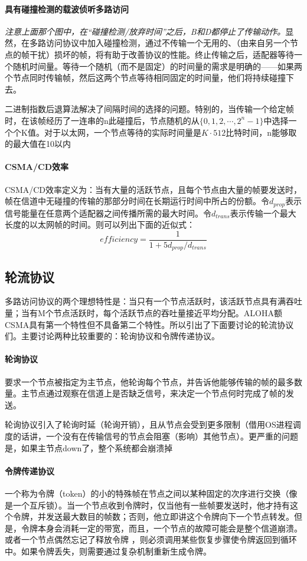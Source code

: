 \documentclass[]{report}
\newcommand{\myCoral}{\color[HTML]{FF7F50}} %
\newcommand{\quan}[1]{{\nmfont \symbol{#1}}}
\newcommand{\kk}[1]{\quan{\numexpr32+#1}}%
\begin{document}
			\paragraph{具有碰撞检测的载波侦听多路访问}
			\textit{注意上面那个图中，在“碰撞检测/放弃时间”之后，B和D都停止了传输动作。}显然，在多路访问协议中加入碰撞检测，通过不传输一个无用的、（由来自另一个节点的帧干扰）损坏的帧，将有助于改善协议的性能。终止传输之后，适配器等待一个随机时间量。等待一个随机（而不是固定）的时间量的需求是明确的——如果两个节点同时传输帧，然后这两个节点等待相同固定的时间量，他们将持续碰撞下去。\par
			二进制指数后退算法解决了间隔时间的选择的问题。特别的，当传输一个给定帧时，在该帧经历了一连串的n此碰撞后，节点随机的从$\{0,1,2,\cdots,2^n-1\}$中选择一个个K值。对于以太网，一个节点等待的实际时间量是$K\cdot512$比特时间，n能够取的最大值在10以内\par
			\paragraph{CSMA/CD效率} CSMA/CD效率定义为：当有大量的活跃节点，且每个节点由大量的帧要发送时，帧在信道中无碰撞的传输的那部分时间在长期运行时间中所占的份额。令$d_{prop}$表示信号能量在任意两个适配器之间传播所需的最大时间。令$d_{trans}$表示传输一个最大长度的以太网帧的时间。则可以列出下面的近似式：
			\[efficiency=\frac{1}{1+5d_{prop}/d_{trans}}\]
		\subsection{轮流协议}
		{\myCoral 多路访问协议的两个理想特性是：\kk{1}当只有一个节点活跃时，该活跃节点具有满吞吐量；\kk{2}当有M个节点活跃时，每个活跃节点的吞吐量接近平均分配。}ALOHA额CSMA具有第一个特性但不具备第二个特性。所以引出了下面要讨论的轮流协议们。主要讨论两种比较重要的：轮询协议和令牌传递协议。
			\paragraph{轮询协议}
			要求一个节点被指定为主节点，他轮询每个节点，并告诉他能够传输的帧的最多数量。主节点通过观察在信道上是否缺乏信号，来决定一个节点何时完成了帧的发送。\par
			轮询协议引入了轮询时延（轮询开销），且从节点会受到更多限制（借用OS进程调度的话讲，一个没有在传输信号的节点会阻塞（影响）其他节点）。更严重的问题是，如果主节点down了，整个系统都会崩溃掉
			\paragraph{令牌传递协议}
			一个称为令牌（token）的小的特殊帧在节点之间以某种固定的次序进行交换（像是一个互斥锁）。当一个节点收到令牌时，仅当他有一些帧要发送时，他才持有这个令牌，并发送最大数目的帧数；否则，他立即讲这个令牌向下一个节点转发。但是，令牌本身会消耗一定的带宽，而且，一个节点的故障可能会是整个信道崩溃。或者一个节点偶然忘记了释放令牌 ，则必须调用某些恢复步骤使令牌返回到循环中。如果令牌丢失，则需要通过复杂机制重新生成令牌。
\end{document}
